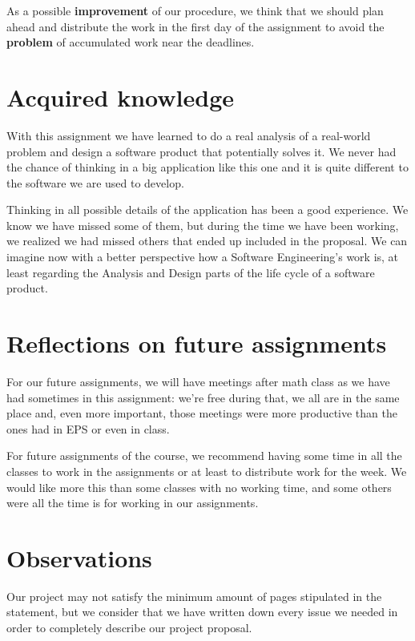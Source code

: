 As a possible \textbf{improvement} of our procedure, we think that we should plan ahead and distribute the work in the first day of the assignment to avoid the \textbf{problem} of accumulated work near the deadlines.

\section{Acquired knowledge}

With this assignment we have learned to do a real analysis of a real-world problem and design a software product that potentially solves it. We never had the chance of thinking in a big application like this one and it is quite different to the software we are used to develop.

Thinking in all possible details of the application has been a good experience. We know we have missed some of them, but during the time we have been working, we realized we had missed others that ended up included in the proposal. We can imagine now with a better perspective how a Software Engineering's work is, at least regarding the Analysis and Design parts of the life cycle of a software product.

\section{Reflections on future assignments}

For our future assignments, we will have meetings after math class as we have had sometimes in this assignment: we're free during that, we all are in the same place and, even more important, those meetings were more productive than the ones had in EPS or even in class.

For future assignments of the course, we recommend having some time in all the classes to work in the assignments or at least to distribute work for the week. We would like more this than some classes with no working time, and some others were all the time is for working in our assignments.

\section{Observations}

Our project may not satisfy the minimum amount of pages stipulated in the statement, but we consider that we have written down every issue we needed in order to completely describe our project proposal.

